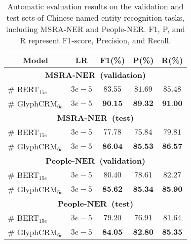 
\begin{table}[t]
\renewcommand\arraystretch{1.1}
    \centering
     \caption{Automatic evaluation results on the validation and test sets of Chinese named entity recognition tasks, including MSRA-NER and People-NER. F1, P, and R represent F1-score, Precision, and Recall.}
    \label{tab:exp4}
    \begin{tabular}{lcccc}
    \toprule[0.9pt]
    \multicolumn{1}{c}{\textbf{Model}} & \multicolumn{1}{c}{\textbf{LR}} & \multicolumn{1}{c}{\textbf{F1(\%)}} & \multicolumn{1}{c}{\textbf{P(\%)}}&
    \multicolumn{1}{c}{\textbf{R(\%)}}\\\midrule[0.7pt]
    \multicolumn{5}{c}{\textbf{MSRA-NER~(validation)}}\\\hline
    \# BERT$_{15e}$ & $3e-5$ & $83.55$ & $81.69$& $85.48$\\
    \# GlyphCRM$_{6e}$ & $3e-5$ & $\textbf{90.15}$ & $\textbf{89.32}$& $\textbf{91.00}$\\\midrule[0.7pt]
    \multicolumn{5}{c}{\textbf{MSRA-NER~(test)}}\\ \hline
    \# BERT$_{15e}$ & $3e-5$ & $77.78$ & $75.84$ &$79.81$\\
    \# GlyphCRM$_{6e}$ & $3e-5$ & $\textbf{86.04}$ & $\textbf{85.53}$ &$\textbf{86.57}$\\ \midrule[0.7pt]
    \multicolumn{5}{c}{\textbf{People-NER~(validation)}}\\\hline
    \# BERT$_{15e}$ & $3e-5$ & $80.40$ & $78.61$& $82.27$\\
    \# GlyphCRM$_{6e}$ & $3e-5$ & $\textbf{85.62}$ & $\textbf{85.34}$& $\textbf{85.90}$\\\midrule[0.7pt]
    \multicolumn{5}{c}{\textbf{People-NER~(test)}}\\\hline
    \# BERT$_{15e}$ & $3e-5$ & $79.20$ & $76.91$& $81.64$\\
    \# GlyphCRM$_{6e}$ & $3e-5$ & $\textbf{84.05}$ & $\textbf{82.80}$& $\textbf{85.35}$\\
    \bottomrule[0.9pt]
    \end{tabular}
\end{table}

